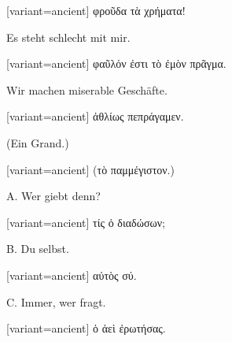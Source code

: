 \switchcolumn

\begin{greek}[variant=ancient]%
φροῦδα τὰ χρήματα!

\end{greek}%
\switchcolumn*

Es steht schlecht mit mir.

\switchcolumn

\begin{greek}[variant=ancient]%
φαῦλόν ἐστι τὸ ἐμὸν πρᾶγμα.

\end{greek}%
\switchcolumn*

Wir machen miserable Geschäfte.

\switchcolumn

\begin{greek}[variant=ancient]%
ἀθλίως πεπράγαμεν.

\end{greek}%
(Ein Grand.)

\switchcolumn

\begin{greek}[variant=ancient]%
(τὸ παμμέγιστον.)

\end{greek}%
\switchcolumn*

A. Wer giebt denn?

\switchcolumn

\begin{greek}[variant=ancient]%
τίς ὁ διαδώσων;

\end{greek}%
\switchcolumn*

B. Du selbst.

\switchcolumn

\begin{greek}[variant=ancient]%
αὐτὸς σύ.

\end{greek}%
\switchcolumn*

C. Immer, wer fragt.

\switchcolumn

\begin{greek}[variant=ancient]%
ὁ ἀεὶ ἐρωτήσας.

\end{greek}%
\switchcolumn*


